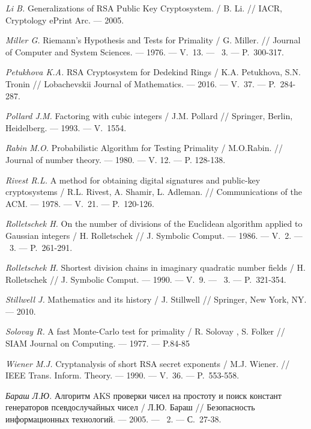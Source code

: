 \begin{thebibliography}{99}
    \textit{Li B.} Generalizations of RSA Public Key Cryptosystem. / B. Li. // IACR, Cryptology ePrint Arc. — 2005.

    \textit{Miller G.} Riemann's Hypothesis and Tests for Primality / G. Miller. // Journal of Computer and System Sciences. — 1976. — V.~13. — ~3. — {P.}~300-317.
    
    \textit{Petukhova K.A.} RSA Cryptosystem for Dedekind Rings / K.A. Petukhova, S.N. Tronin // Lobachevskii Journal of Mathematics. — 2016. — V.~37. — P.~284-287.
    
    \textit{Pollard J.M.} Factoring with cubic integers / J.M. Pollard // Springer, Berlin, Heidelberg. — 1993. — V.~1554.

    \textit{Rabin M.O.} Probabilistic Algorithm for Testing Primality / M.O.Rabin. // Journal of number theory. — 1980. — V. 12. — P. 128-138.
    
    \textit{Rivest R.L.} A method for obtaining digital signatures and public-key cryptosystems / R.L. Rivest, A. Shamir, L. Adleman. // Communications of the ACM. — 1978. — V.~21. — P.~120-126.
    
    \textit{Rolletschek H.} On the number of divisions of the Euclidean algorithm applied to Gaussian integers / H. Rolletschek // J. Symbolic Comput. — 1986. — V.~2. — \textnumero~3. — P.~261-291.
    
    \textit{Rolletschek H.} Shortest division chains in imaginary quadratic number fields / H. Rolletschek // J. Symbolic Comput. — 1990. — V.~9. — {\textnumero}~3. — P.~321-354.

    \textit{Stillwell J.} Mathematics and its history / J. Stillwell // Springer, New York, NY. — 2010.

    \textit{Solovay R.} A fast Monte-Carlo test for primality / R. Solovay , S. Folker // SIAM Journal on Computing. — 1977. — P.84-85
    
    \textit{Wiener M.J.} Cryptanalysis of short RSA secret exponents / M.J. Wiener. // IEEE Trans. Inform. Theory. — 1990. — V.~36. — P.~553-558.

    \textit{Бараш Л.Ю.} Алгоритм AKS проверки чисел на простоту и поиск констант генераторов псевдослучайных чисел / Л.Ю. Бараш // Безопасность информационных технологий. — 2005. — \textnumero~2. — С.~27-38.


\end{thebibliography}
